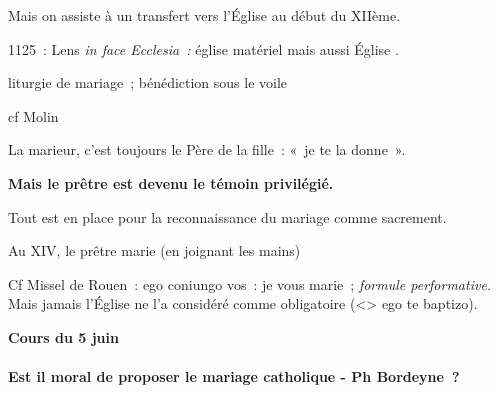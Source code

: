 Mais on assiste à un transfert vers l'Église au début du XIIème.

1125~: Lens \emph{in face Ecclesia~:} église matériel mais aussi Église
.

liturgie de mariage~; bénédiction sous le voile

cf Molin

La marieur, c'est toujours le Père de la fille~: «~je te la donne~».

\textbf{Mais le prêtre est devenu le témoin privilégié.}

Tout est en place pour la reconnaissance du mariage comme sacrement.

Au XIV, le prêtre marie (en joignant les mains)

Cf Missel de Rouen~: ego coniungo vos~: je vous marie~; \emph{formule
performative.} Mais jamais l'Église ne l'a considéré comme obligatoire
(\textless\textgreater{} ego te baptizo).

\textbf{Cours du 5 juin}

\hypertarget{est-il-moral-de-proposer-le-mariage-catholique---ph-bordeyne}{%
\paragraph{Est il moral de proposer le mariage catholique - Ph
Bordeyne~?}\label{est-il-moral-de-proposer-le-mariage-catholique---ph-bordeyne}}

